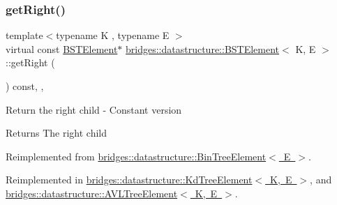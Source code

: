 \mbox{\label{classbridges_1_1datastructure_1_1_b_s_t_element_a012f0eb09c3d62b14c73109e6ded0879}} 
\subsubsection{\texorpdfstring{get\+Right()}{getRight()}\hspace{0.1cm}{\footnotesize\ttfamily [2/2]}}
{\footnotesize\ttfamily template$<$typename K , typename E $>$ \\
virtual const \mbox{\hyperlink{classbridges_1_1datastructure_1_1_b_s_t_element}{B\+S\+T\+Element}}$\ast$ \mbox{\hyperlink{classbridges_1_1datastructure_1_1_b_s_t_element}{bridges\+::datastructure\+::\+B\+S\+T\+Element}}$<$ K, E $>$\+::get\+Right (\begin{DoxyParamCaption}{ }\end{DoxyParamCaption}) const\hspace{0.3cm}{\ttfamily [inline]}, {\ttfamily [override]}, {\ttfamily [virtual]}}

Return the right child -\/ Constant version \begin{DoxyReturn}{Returns}
The right child 
\end{DoxyReturn}


Reimplemented from \mbox{\hyperlink{classbridges_1_1datastructure_1_1_bin_tree_element_a795b1696d628b55dafb2bc1aa961843a}{bridges\+::datastructure\+::\+Bin\+Tree\+Element$<$ E $>$}}.



Reimplemented in \mbox{\hyperlink{classbridges_1_1datastructure_1_1_kd_tree_element_ae8d6007d3848b72cbfc11d2e29120781}{bridges\+::datastructure\+::\+Kd\+Tree\+Element$<$ K, E $>$}}, and \mbox{\hyperlink{classbridges_1_1datastructure_1_1_a_v_l_tree_element_a5a2c4b96b51da1daa3c0426882250acb}{bridges\+::datastructure\+::\+A\+V\+L\+Tree\+Element$<$ K, E $>$}}.

\mbox{\label{classbridges_1_1datastructure_1_1_b_s_t_element_a06d80480736ae19052e2d1bc6345323a}} 
